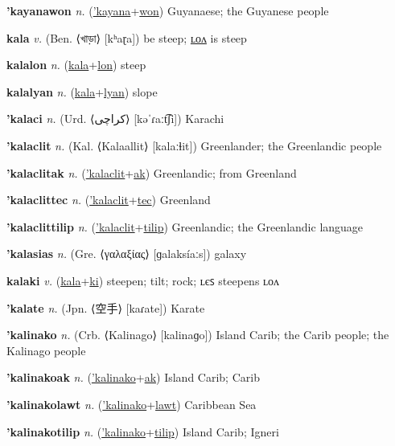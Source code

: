 \textbf{\hypertarget{'kayanawon}{'kayanawon}} \textit{n.} (\hyperlink{'kayana}{'kayana}+\allowbreak \hyperlink{won}{won})
Guyanaese; the Guyanese people

\textbf{\hypertarget{kala}{kala}} \textit{v.} (Ben. ⟨{\bengali{}খাড়া}⟩ [kʰaɽa])
be steep; \hyperlink{kalalon}{ʟᴏᴧ} is steep

\textbf{\hypertarget{kalalon}{kalalon}} \textit{n.} (\hyperlink{kala}{kala}+\allowbreak \hyperlink{lon}{lon})
steep

\textbf{\hypertarget{kalalyan}{kalalyan}} \textit{n.} (\hyperlink{kala}{kala}+\allowbreak \hyperlink{lyan}{lyan})
slope

\textbf{\hypertarget{'kalaci}{'kalaci}} \textit{n.} (Urd. ⟨{\arabics{}کراچی‎}⟩ [kəˈɾaːt͡ʃi])
Karachi

\textbf{\hypertarget{'kalaclit}{'kalaclit}} \textit{n.} (Kal. ⟨Kalaallit⟩ [kalaːɬit])
Greenlander; the Greenlandic people

\textbf{\hypertarget{'kalaclitak}{'kalaclitak}} \textit{n.} (\hyperlink{'kalaclit}{'kalaclit}+\allowbreak \hyperlink{ak}{ak})
Greenlandic; from Greenland

\textbf{\hypertarget{'kalaclittec}{'kalaclittec}} \textit{n.} (\hyperlink{'kalaclit}{'kalaclit}+\allowbreak \hyperlink{tec}{tec})
Greenland

\textbf{\hypertarget{'kalaclittilip}{'kalaclittilip}} \textit{n.} (\hyperlink{'kalaclit}{'kalaclit}+\allowbreak \hyperlink{tilip}{tilip})
Greenlandic; the Greenlandic language

\textbf{\hypertarget{'kalasias}{'kalasias}} \textit{n.} (Gre. ⟨γαλαξίας⟩ [ɡalaksíaːs])
galaxy

\textbf{\hypertarget{kalaki}{kalaki}} \textit{v.} (\hyperlink{kala}{kala}+\allowbreak \hyperlink{ki}{ki})
steepen; tilt; rock; ʟєꜱ steepens ʟᴏᴧ

\textbf{\hypertarget{'kalate}{'kalate}} \textit{n.} (Jpn. ⟨{\japanese{}空手}⟩ [kaɾate])
Karate

\textbf{\hypertarget{'kalinako}{'kalinako}} \textit{n.} (Crb. ⟨Kalinago⟩ [kalinaɡo])
Island Carib; the Carib people; the Kalinago people

\textbf{\hypertarget{'kalinakoak}{'kalinakoak}} \textit{n.} (\hyperlink{'kalinako}{'kalinako}+\allowbreak \hyperlink{ak}{ak})
Island Carib; Carib

\textbf{\hypertarget{'kalinakolawt}{'kalinakolawt}} \textit{n.} (\hyperlink{'kalinako}{'kalinako}+\allowbreak \hyperlink{lawt}{lawt})
Caribbean Sea

\textbf{\hypertarget{'kalinakotilip}{'kalinakotilip}} \textit{n.} (\hyperlink{'kalinako}{'kalinako}+\allowbreak \hyperlink{tilip}{tilip})
Island Carib; Igneri


